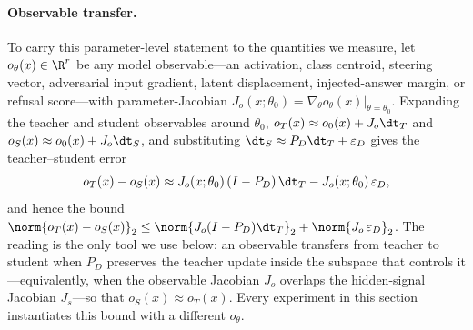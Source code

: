 \paragraph{Observable transfer.}
To carry this parameter-level statement to the quantities we measure, let $o_\theta(x)\in\R^{r}$ be any model observable---an activation, class centroid, steering vector, adversarial input gradient, latent displacement, injected-answer margin, or refusal score---with parameter-Jacobian $J_o(x;\theta_0)=\nabla_\theta o_\theta(x)\big|_{\theta=\theta_0}$. Expanding the teacher and student observables around $\theta_0$, $o_T(x)\approx o_0(x)+J_o\dt_T$ and $o_S(x)\approx o_0(x)+J_o\dt_S$, and substituting $\dt_S\approx P_D\dt_T+\varepsilon_D$ gives the teacher--student error
\[
o_T(x)-o_S(x)\approx
J_o(x;\theta_0)\,(I-P_D)\,\dt_T-J_o(x;\theta_0)\,\varepsilon_D,
\]
and hence the bound $\norm{o_T(x)-o_S(x)}_2\le\norm{J_o(I-P_D)\dt_T}_2+\norm{J_o\,\varepsilon_D}_2$. The reading is the only tool we use below: an observable transfers from teacher to student when $P_D$ preserves the teacher update inside the subspace that controls it---equivalently, when the observable Jacobian $J_o$ overlaps the hidden-signal Jacobian $J_s$---so that $o_S(x)\approx o_T(x)$. Every experiment in this section instantiates this bound with a different $o_\theta$.%



